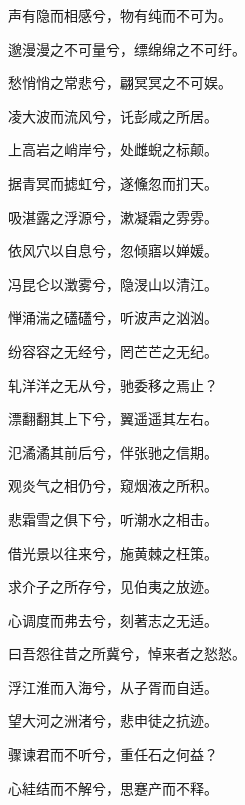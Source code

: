\documentclass[12pt,a4paper]{ctexbook}
\begin{document}
声有隐而相感兮，物有纯而不可为。\par
邈漫漫之不可量兮，缥绵绵之不可纡。\par
愁悄悄之常悲兮，翩冥冥之不可娱。\par
凌大波而流风兮，讬彭咸之所居。\par
上高岩之峭岸兮，处雌蜺之标颠。\par
据青冥而摅虹兮，遂儵忽而扪天。\par
吸湛露之浮源兮，漱凝霜之雰雰。\par
依风穴以自息兮，忽倾寤以婵媛。\par
冯昆仑以澂雾兮，隐渂山以清江。\par
惮涌湍之礚礚兮，听波声之汹汹。\par
纷容容之无经兮，罔芒芒之无纪。\par
轧洋洋之无从兮，驰委移之焉止？\par
漂翻翻其上下兮，翼遥遥其左右。\par
氾潏潏其前后兮，伴张驰之信期。\par
观炎气之相仍兮，窥烟液之所积。\par
悲霜雪之俱下兮，听潮水之相击。\par
借光景以往来兮，施黄棘之枉策。\par
求介子之所存兮，见伯夷之放迹。\par
心调度而弗去兮，刻著志之无适。\par
曰吾怨往昔之所冀兮，悼来者之悐悐。\par
浮江淮而入海兮，从子胥而自适。\par
望大河之洲渚兮，悲申徒之抗迹。\par
骤谏君而不听兮，重任石之何益？\par
心絓结而不解兮，思蹇产而不释。\par
\end{document}
